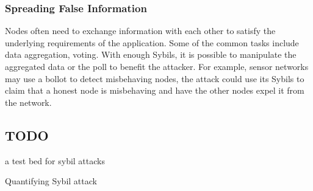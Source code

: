 \subsubsection{Spreading False Information}
Nodes often need to exchange information with each other to satisfy the
underlying requirements of the application. Some of the common tasks include
data aggregation, voting. With enough Sybils, it is possible to manipulate the
aggregated data or the poll to benefit the attacker. For example, sensor
networks may use a bollot to detect misbehaving nodes, the attack could use its
Sybils to claim that a honest node is misbehaving and have the other nodes expel
it from the network\cite{newsome2004sybil}.


\subsection{TODO}
a test bed for sybil attacks\cite{irissappane2012towards}

Quantifying Sybil attack\cite{margolin2008quantifying}

